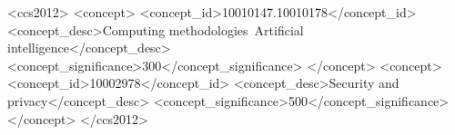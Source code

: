 \documentclass[sigconf,anonymous,review]{acmart}
\begin{document}
	\begin{CCSXML}
		<ccs2012>
		<concept>
		<concept_id>10010147.10010178</concept_id>
		<concept_desc>Computing methodologies~Artificial intelligence</concept_desc>
		<concept_significance>300</concept_significance>
		</concept>
		<concept>
		<concept_id>10002978</concept_id>
		<concept_desc>Security and privacy</concept_desc>
		<concept_significance>500</concept_significance>
		</concept>
		</ccs2012>
	\end{CCSXML}
	
	
	
	
	
	\maketitle
	
	
	
	
	
	
	
	
	
	
	
	
	
	
	
	
	
	
	
	
	
	\appendix
	
	
	
	
\end{document}
